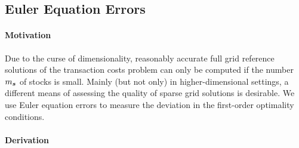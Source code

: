 \subsection{Euler Equation Errors}
\label{sec:834eulerErrors}

\paragraph{Motivation}

Due to the curse of dimensionality,
reasonably accurate full grid reference solutions
of the transaction costs problem can only be computed
if the number $m_{{\boldsymbol{s}}}$ of stocks is small.
Mainly (but not only) in higher-dimensional settings,
a different means of assessing the
quality of sparse grid solutions is desirable.
We use Euler equation errors to measure the deviation in
the first-order optimality conditions.

\paragraph{Derivation}

